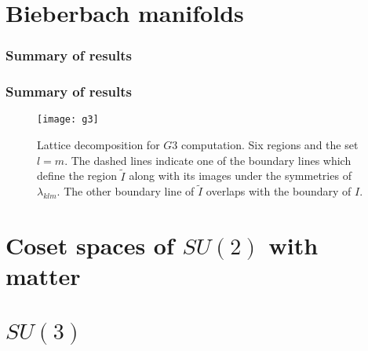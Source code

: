 \documentclass{beamer}
\begin{document}
\section{Bieberbach manifolds}
\begin{frame}
	\frametitle{Summary of results}
\end{frame}

\begin{frame}
	\frametitle{Summary of results}

	\begin{figure}
	\texttt{[image: g3]}
	\caption{Lattice decomposition for $G3$ computation.   Six regions and the set $l=m$.  The dashed lines indicate one of the boundary lines which define the region $\tilde{I}$ along with its images under the symmetries of $\lambda_{klm}$. The other boundary line of $\tilde{I}$ overlaps with the boundary of $I$. \label{g3Fig}}
	\end{figure}
\end{frame}

\section{Coset spaces of $SU(2)$ with matter}
\section{$SU(3)$}
\end{document}
